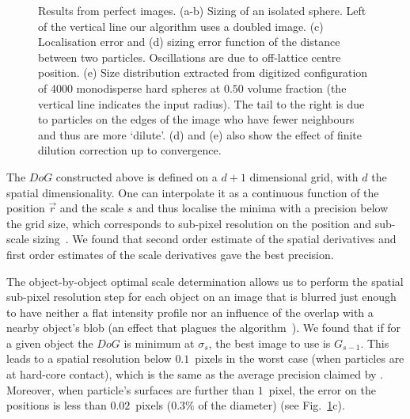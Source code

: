 \documentclass[8.5pt,twoside,twocolumn]{article}
\begin{document}
\begin{figure}
	\caption{Results from perfect images. (a-b) Sizing of an isolated sphere. Left of the vertical line our algorithm uses a doubled image. (c) Localisation error and (d) sizing error function of the distance between two particles. Oscillations are due to off-lattice centre position. (e) Size distribution extracted from digitized configuration of 4000 monodisperse hard spheres at $0.50$ volume fraction (the vertical line indicates the input radius). The tail to the right is due to particles on the edges of the image who have fewer neighbours and thus are more `dilute'. (d) and (e) also show the effect of finite dilution correction up to convergence.}
	\label{fig:perfect}
\end{figure}

The $DoG$ constructed above is defined on a $d+1$ dimensional grid, with $d$ the spatial dimensionality. One can interpolate it as a continuous function of the position $\vec{r}$ and the scale $s$ and thus localise the minima with a precision below the grid size, which corresponds to sub-pixel resolution on the position and sub-scale sizing~\citep{Lowe2004}. We found that second order estimate of the spatial derivatives and first order estimates of the scale derivatives gave the best precision.

The object-by-object optimal scale determination allows us to perform the spatial sub-pixel resolution step for each object on an image that is blurred just enough to have neither a flat intensity profile nor an influence of the overlap with a nearby object's blob (an effect that plagues the \citet{Crocker1996} algorithm~\cite{Baumgartl2005,Jenkins2008}). We found that if for a given object the $DoG$ is minimum at $\sigma_s$, the best image to use is $G_{s-1}$. This leads to a spatial resolution below $0.1$~pixels in the worst case (when particles are at hard-core contact), which is the same as the average precision claimed by \citet{Crocker1996}. Moreover, when particle's surfaces are further than $1$~pixel, the error on the positions is less than $0.02$~pixels ($0.3\%$ of the diameter) (see Fig.~\ref{fig:perfect}c).
\end{document}
